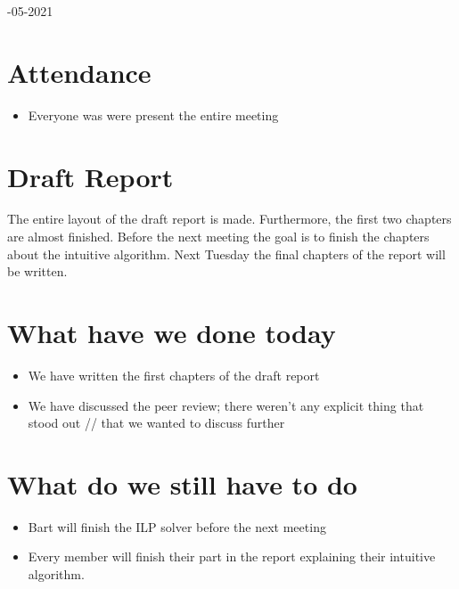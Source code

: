 \documentclass{article}
\begin{document}
-05-2021
\section{Attendance}
\begin{itemize}
    \item Everyone was were present the entire meeting
\end{itemize}

\section{Draft Report}
The entire layout of the draft report is made. Furthermore, the first two chapters are almost finished. Before the next meeting the goal is to finish the chapters about the intuitive algorithm. Next Tuesday the final chapters of the report will be written. 


\section{What have we done today}
\begin{itemize}
    \item We have written the first chapters of the draft report
    \item We have discussed the peer review; there weren't any explicit thing that stood out // that we wanted to discuss further

\end{itemize}

\section{What do we still have to do}
\begin{itemize}
    \item Bart will finish the ILP solver before the next meeting
    \item Every member will finish their part in the report explaining their intuitive algorithm.
\end{itemize}
\end{document}
